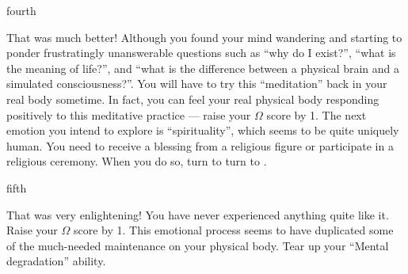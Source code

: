 \documentclass[notebook]{guildcamp1}
\begin{document}
\begin{page}{fourth}

That was much better! Although you found your mind wandering and starting to ponder frustratingly unanswerable questions such as ``why do I exist?'', ``what is the meaning of life?'', and ``what is the difference between a physical brain and a simulated consciousness?''. You will have to try this ``meditation'' back in your real body sometime. In fact, you can feel your real physical body responding positively to this meditative practice --- raise your $\Omega$ score by 1. The next emotion you intend to explore is ``spirituality'', which seems to be quite uniquely human. You need to receive a blessing from a religious figure or participate in a religious ceremony. When you do so, turn to turn to .

\end{page}

\begin{page}{fifth}

That was very enlightening! You have never experienced anything quite like it. Raise your $\Omega$ score by 1. This emotional process seems to have duplicated some of the much-needed maintenance on your physical body. Tear up your ``Mental degradation'' ability.

\end{page}

\endnotebook
\end{document}

